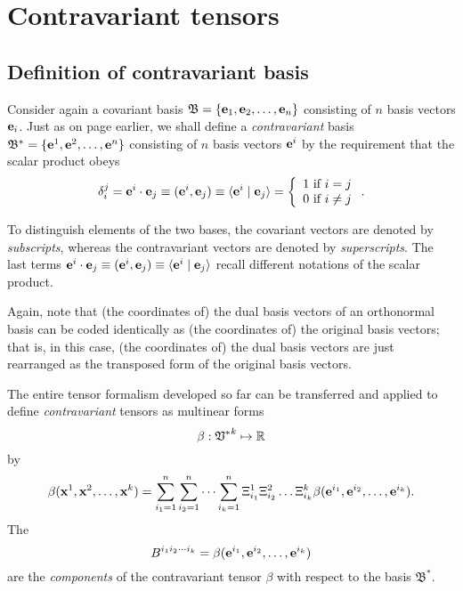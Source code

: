 \section{Contravariant tensors}

\subsection{Definition of contravariant basis}

Consider again a covariant basis
${\mathfrak B}=\{{\bf e}_1,{\bf e}_2,\ldots ,{\bf e}_n\}$ consisting of
$n$ basis vectors ${\bf e}_i$.
Just as on page \pageref{2011-m-Dualbasis} earlier, we shall define a {\em contravariant} basis
${\mathfrak B^\ast}=\{{\bf e}^1,{\bf e}^2,\ldots ,{\bf e}^n\}$ consisting of
$n$ basis vectors ${\bf e}^i$
by the requirement that the scalar product obeys
\begin{equation}
\delta_i^j =  {\bf e}^i\cdot{\bf e}_j\equiv ({\bf e}^i,{\bf e}_j)\equiv \langle {\bf e}^i\mid {\bf e}_j\rangle
 =\left\{
 \begin{array}{l}
1 \mbox{ if } i=j \\
0 \mbox{ if } i\neq j  \\
\end{array}
 \right. .
\label{2001-mu-tensors0}
\end{equation}



To distinguish elements of the two bases, the covariant vectors are denoted by {\em subscripts},
whereas the contravariant vectors are denoted by {\em superscripts}.
The last terms $ {\bf e}^i\cdot{\bf e}_j\equiv ({\bf e}^i,{\bf e}_j)\equiv \langle {\bf e}^i\mid {\bf e}_j\rangle  $
recall different notations of the scalar product.

Again, note that (the coordinates of) the dual basis vectors of an orthonormal basis can be coded identically
as  (the coordinates of) the original basis vectors; that is,
in this case,
(the coordinates of) the dual basis vectors are just rearranged as the transposed form of the original basis vectors.


The entire tensor formalism developed so far can be transferred and applied to define {\em contravariant} tensors
as multinear forms
\begin{equation}
\beta:{ \frak V^\ast }^k \mapsto {\Bbb R}
\end{equation}
by
\begin{equation}
\beta ( {\bf x}^1,{\bf x}^2,\ldots ,{\bf x}^k)=
\sum_{i_1=1}^n
\sum_{i_2=1}^n
\cdots
\sum_{i_k=1}^n
\Xi_{i_1}^1 \Xi_{i_2}^2\ldots \Xi_{i_k}^k
\beta ( {\bf e}^{i_1},{\bf e}^{i_2},\ldots ,{\bf e}^{i_k}).
\end{equation}
The
\begin{equation}
B^{{i_1}{i_2}\cdots {i_k}}=\beta ( {\bf e}^{i_1},{\bf e}^{i_2},\ldots ,{\bf e}^{i_k})
\label{2011-m-tvtcontrav}
\end{equation}
 are the
{\em components} of the contravariant tensor $\beta $ with respect to the basis
${\mathfrak B}^\ast$.



